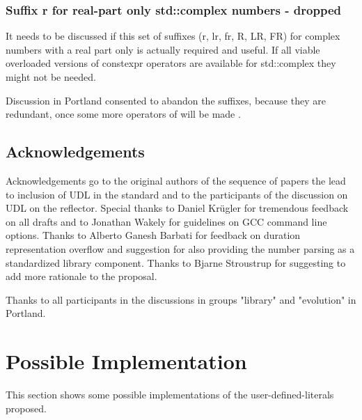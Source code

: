 \documentclass[ebook,11pt,article]{memoir}
\begin{document}


\subsection{Suffix r for real-part only std::complex numbers - dropped}
It needs to be discussed if this set of suffixes (r, lr, fr, R, LR, FR) for complex numbers with a real part only is actually required and useful. If all viable overloaded versions of constexpr operators are available for std::complex they might not be needed.

Discussion in Portland consented to abandon the  suffixes, because they are redundant, once some more operators of  will be made .

\section{Acknowledgements}
Acknowledgements go to the original authors of the sequence of papers the lead to inclusion of UDL in the standard and to the participants of the discussion on UDL on the reflector. Special thanks to Daniel Kr\"ugler for tremendous feedback on all drafts and to Jonathan Wakely for guidelines on GCC command line options. Thanks to Alberto Ganesh Barbati for feedback on duration representation overflow and suggestion for also providing the number parsing as a standardized library component. Thanks to Bjarne Stroustrup for suggesting to add more rationale to the proposal.

Thanks to all participants in the discussions in groups "library" and "evolution" in Portland.

\chapter{Possible Implementation}
This section shows some possible implementations of the user-defined-literals proposed.
\end{document}
